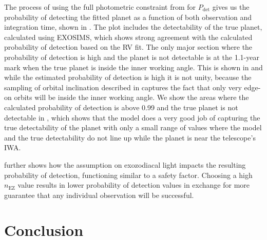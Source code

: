 The process of using the full photometric constraint from 
for $P_\textrm{det}$ gives us the probability of detecting the fitted planet as
a function of both observation and integration time, shown in
. The plot includes the detectability of
the true planet, calculated using EXOSIMS, which shows strong agreement with
the calculated probability of detection based on the RV fit. The only major
section where the probability of detection is high and the planet is not
detectable is at the 1.1-year mark when the true planet is inside the inner
working angle. This is shown in  and while
the estimated probability of detection is high it is not unity, because the
sampling of orbital inclination described in  captures the fact that
only very edge-on orbits will be inside the inner working angle. We show the
areas where the calculated probability of detection is above 0.99 and the true
planet is not detectable in , which shows that
the model does a very good job of capturing the true detectability of the
planet with only a small range of values where the model and the true
detectability do not line up while the planet is near the telescope's IWA.

 further shows how the assumption on
exozodiacal light impacts the resulting probability of detection, functioning
similar to a safety factor. Choosing a high $n_\textrm{EZ}$ value results in
lower probability of detection values in exchange for more guarantee that
any individual observation will be successful.


\section{Conclusion} %
\label{sec:con_ddMag_comp}


